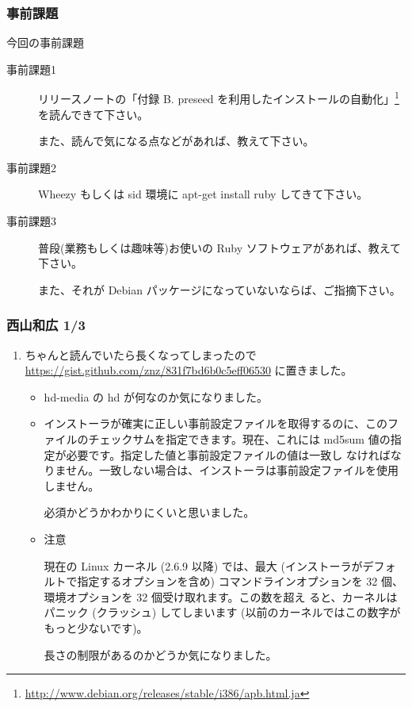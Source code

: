 \documentclass[cjk,dvipdfmx,10pt,compress,%
hyperref={bookmarks=true,bookmarksnumbered=true,bookmarksopen=false,%
colorlinks=false,%
pdftitle={第 69 回 関西 Debian 勉強会},%
pdfauthor={倉敷・のがた・佐々木・かわだ},%
pdfsubject={資料},%
}]{beamer}
\begin{document}
\begin{frame}[fragile]
  \frametitle{事前課題}
  \begin{block}{今回の事前課題}
    \begin{description}
    \item[事前課題1] リリースノートの「付録 B. preseed を利用したインストールの自動化」\footnote{\url{http://www.debian.org/releases/stable/i386/apb.html.ja}}を読んできて下さい。

    また、読んで気になる点などがあれば、教えて下さい。
    \item[事前課題2] Wheezy もしくは sid 環境に apt-get install ruby してきて下さい。
    \item[事前課題3] 普段(業務もしくは趣味等)お使いの Ruby ソフトウェアがあれば、教えて下さい。

    また、それが Debian パッケージになっていないならば、ご指摘下さい。
    \end{description}
  \end{block}
\end{frame}


\begin{frame}
  \frametitle{ 西山和広 1/3 }
  \begin{enumerate}
  \item[1] ちゃんと読んでいたら長くなってしまったので \url{https://gist.github.com/znz/831f7bd6b0c5eff06530} に置きました。

    \begin{itemize}
    \item[B.1.1.]
      hd-media の hd が何なのか気になりました。
    \item[B.2.1.]
      インストーラが確実に正しい事前設定ファイルを取得するのに、このファイルのチェックサムを指定できます。現在、これには md5sum 値の指定が必要です。指定した値と事前設定ファイルの値は一致し
      なければなりません。一致しない場合は、インストーラは事前設定ファイルを使用しません。
   
      必須かどうかわかりにくいと思いました。
    \item[B.2.2.]
      注意

      現在の Linux カーネル (2.6.9 以降) では、最大 (インストーラがデフォルトで指定するオプションを含め) コマンドラインオプションを 32 個、環境オプションを 32 個受け取れます。この数を超え    ると、カーネルはパニック (クラッシュ) してしまいます (以前のカーネルではこの数字がもっと少ないです)。
   
      長さの制限があるのかどうか気になりました。

    \end{itemize}
  \end{enumerate}
\end{frame}
\end{document}
